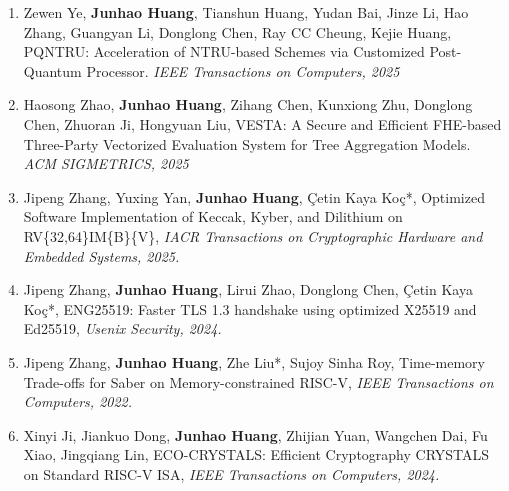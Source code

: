 \documentclass[letterpaper,11pt]{article}
\begin{document}
\begin{enumerate}
{	}
	\item {
		{Zewen Ye, \textbf{Junhao Huang}, Tianshun Huang, Yudan Bai, Jinze Li, Hao Zhang, Guangyan Li, Donglong Chen, Ray CC Cheung, Kejie Huang}, {PQNTRU: Acceleration of NTRU-based Schemes via Customized Post-Quantum Processor}. \textit{IEEE Transactions on Computers, 2025} %
	}
	\item {Haosong Zhao, \textbf{Junhao Huang}, Zihang Chen, Kunxiong Zhu, Donglong Chen, Zhuoran Ji, Hongyuan Liu}, {VESTA: A Secure and Efficient FHE-based Three-Party {V}ectorized {E}valuation {S}ystem for {T}ree {A}ggregation Models}. \textit{ACM SIGMETRICS, 2025} %
	\item {	Jipeng Zhang, Yuxing Yan, \textbf{Junhao Huang}, Çetin Kaya Koç*, Optimized Software Implementation of Keccak, Kyber, and Dilithium on RV\{32,64\}IM\{B\}\{V\}, \textit{IACR Transactions on Cryptographic Hardware and Embedded Systems, 2025.} %
	}
	\item {Jipeng Zhang, \textbf{Junhao Huang}, Lirui Zhao, Donglong Chen, Çetin Kaya Koç*, ENG25519: Faster TLS 1.3 handshake using optimized X25519 and Ed25519, \textit{Usenix Security, 2024.} %
	}
	
	\item {Jipeng Zhang, \textbf{Junhao Huang}, Zhe Liu*, Sujoy Sinha Roy, Time-memory Trade-offs for Saber on Memory-constrained RISC-V, \textit{IEEE Transactions on Computers, 2022.} %
	}
	
	\item {Xinyi Ji, Jiankuo Dong, \textbf{Junhao Huang}, Zhijian Yuan, Wangchen Dai, Fu Xiao, Jingqiang Lin, ECO-CRYSTALS: Efficient Cryptography CRYSTALS on Standard RISC-V ISA, \textit{IEEE Transactions on Computers, 2024.} %
	}
\end{enumerate}
\end{document}
